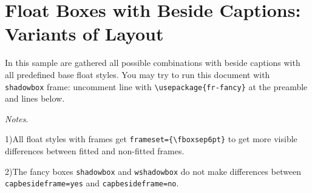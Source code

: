 \documentclass{book}
\providecommand*{\com}[1]{\texttt{\char`\\#1}}
\begin{document}
\chapter{Float Boxes with Beside Captions: Variants of Layout}

In this sample are gathered all possible combinations with beside captions
with all predefined base float styles. You may try to run this document
with \texttt{shadowbox} frame: uncomment line with \verb|\usepackage{fr-fancy}|
at the preamble and lines below.

\emph{Notes}.

1)\enskip All float styles with frames get \verb|frameset={\fboxsep6pt}|
to get more visible differences between fitted and non-fitted frames.

2)\enskip The fancy boxes \texttt{shadowbox} and \texttt{wshadowbox}
do not make differences between \texttt{capbesideframe=yes} and \texttt{capbesideframe=no}.

\raggedright

\newcommand\FIGS[5][]{%
\markboth{\hbox{\small Variant #3}}{\hbox{\small Variant #3}}

\small Variant #3: {\ttfamily\raggedright
style=#2,capposition=beside,\allowbreak capbesideposition=\{#4\},\allowbreak capbesideframe=#5\par}

\clearfloatsetup{figure}
\floatsetup[figure]{style=#2,capposition=beside,capbesideposition=#4,capbesideframe=#5,facing=yes#1}
\begin{figure}[!h]
  {{\fboxsep2pt\fbox{\begin{picture}(128,32)\put(0,0){\line(4,1){128}}\put(0,32){\line(4,-1){128}}\end{picture}}}}%
  \caption{%
   Plain figure in \texttt{#2} style. \texttt{#2} style. Width of column}%
  \label{fig:plain:#3}%
\end{figure}

\begin{figure}[!h]
\fcapside
  {{\fboxsep2pt\fbox{\begin{picture}(128,32)\put(0,0){\line(4,1){128}}\put(0,32){\line(4,-1){128}}\end{picture}}}}%
  {\caption{%
   Figure in \protect\com{ffigbox}. \texttt{#2} style. Width of column}%
  \label{fig:floatbox:#3}}%

\vskip\floatsep
\fcapside[\FBwidth]
  {{\fboxsep2pt\fbox{\begin{picture}(128,32)\put(0,0){\line(4,1){128}}\put(0,32){\line(4,-1){128}}\end{picture}}}}%
  {\caption{%
   Figure in \protect\com{ffigbox}. \texttt{#2} style. Width of graphics}%
   \label{fig:fbwidth:#3}}%
\end{figure}

}
\end{document}
